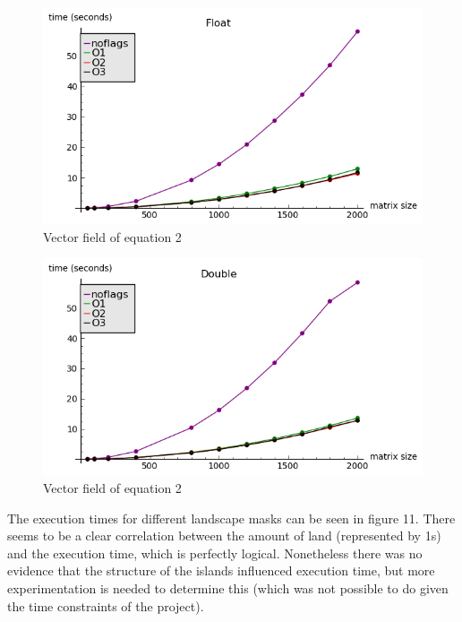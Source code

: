 \documentclass[12pt,a4paper]{article}
\begin{document}
\begin{figure}[hb]
    \centering
    \includegraphics[scale=0.6]{images/float.png}
    \caption{Vector field of equation 2}
\end{figure}

\begin{figure}[hb]
    \centering
    \includegraphics[scale=0.6]{images/double.png}
    \caption{Vector field of equation 2}
\end{figure}



The execution times for different landscape masks can be seen in figure 11. There seems to be a clear correlation between the amount of land (represented by 1s) and the execution time, which is perfectly logical. Nonetheless there was no evidence that the structure of the islands influenced execution time, but more experimentation is needed to determine this (which was not possible to do given the time constraints of the project).
\end{document}
